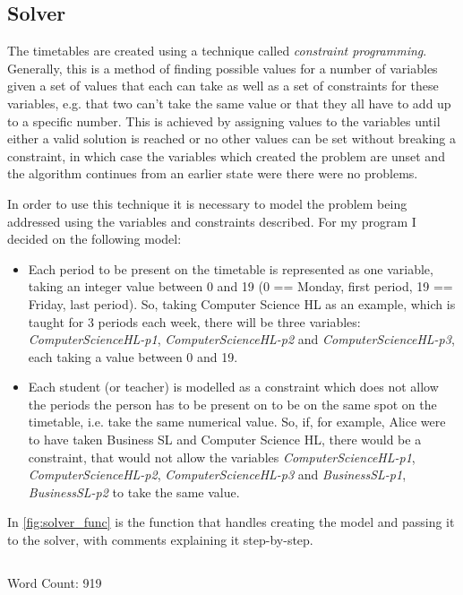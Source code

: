 \documentclass[12pt]{article}
\begin{document}
\subsection{Solver}

The timetables are created using a technique called \emph{constraint programming}.
Generally, this is a method of finding possible values for a number of variables given a set
of values that each can take as well as a set of constraints for these variables, e.g. that
two can't take the same value or that they all have to add up to a specific number.  This is
achieved by assigning values to the variables until either a valid solution is reached or no
other values can be set without breaking a constraint, in which case the variables which
created the problem are unset and the algorithm continues from an earlier state were there
were no problems.

In order to use this technique it is necessary to model the problem being addressed using
the variables and constraints described. For my program I decided on the following model:
%
\begin{itemize}
    \item Each period to be present on the timetable is represented as one variable, taking
        an integer value between 0 and 19 (0 == Monday, first period, 19 == Friday, last
        period). So, taking Computer Science HL as an example, which is taught for 3 periods
        each week, there will be three variables: \textit{ComputerScienceHL-p1},
        \textit{ComputerScienceHL-p2} and \textit{ComputerScienceHL-p3}, each taking a value
        between 0 and 19.

    \item Each student (or teacher) is modelled as a constraint which does not allow the
        periods the person has to be present on to be on the same spot on the timetable,
        i.e. take the same numerical value. So, if, for example, Alice were to have taken
        Business SL and Computer Science HL, there would be a constraint, that would not
        allow the variables \textit{ComputerScienceHL-p1}, \textit{ComputerScienceHL-p2},
        \textit{ComputerScienceHL-p3} and \textit{BusinessSL-p1}, \textit{BusinessSL-p2} to
        take the same value.
\end{itemize}
%

In \autoref{fig:solver_func} is the function that handles creating the model and passing it
to the solver, with comments explaining it step-by-step.

\begin{figure}[H]
    \caption{}
    \inputminted{python}{../media/solver_listing.py}
    \label{fig:solver_func}
\end{figure}

Word Count: 919

\printbibliography[type={software},title={Software \& Libraries}]
\printbibliography[type={online}, title={References}]
\setlength{\parskip}{1em}
\setlength{\parindent}{0em}
\end{document}
